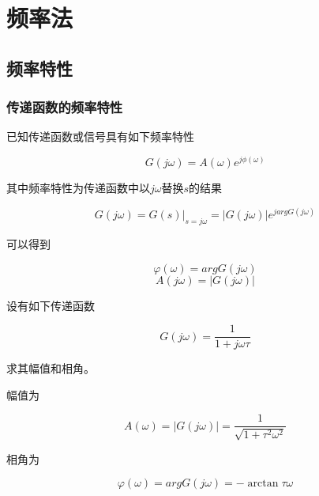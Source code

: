 \documentclass[lang=cn,10pt]{elegantbook}
\begin{document}
\chapter{频率法}

\section{频率特性}

\subsection{传递函数的频率特性}

已知传递函数或信号具有如下频率特性

\begin{equation}
	G(j\omega)=A(\omega)e^{j\phi(\omega)}
\end{equation}

其中频率特性为传递函数中以$j\omega$替换$s$的结果

\begin{equation}
	G(j\omega)=G(s)\Big |_{s=j\omega}=|G(j\omega)|e^{jargG(j\omega)}
\end{equation}

可以得到

\begin{equation}
	\varphi(\omega)=arg{G(j\omega)}
\end{equation}
\begin{equation}
	A(j\omega)=|G(j\omega)|
\end{equation}

\example

设有如下传递函数

\begin{equation}
	G(j\omega)=\frac{1}{1+j\omega\tau}
\end{equation}

求其幅值和相角。

\begin{solution}

	幅值为

	\begin{equation}
		A(\omega)=|G(j\omega)|=\frac{1}{\sqrt{1+\tau^2\omega^2}}
	\end{equation}

	相角为

	\begin{equation}
		\varphi(\omega)=argG(j\omega)=-\arctan{\tau\omega}
	\end{equation}


\end{solution}
\end{document}
